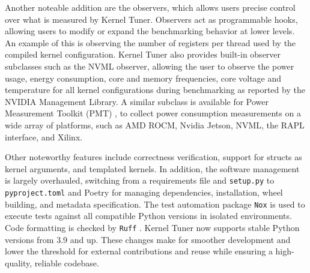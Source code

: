 Another noteable addition are the observers, which allows users precise control over what is measured by Kernel Tuner. Observers act as programmable hooks, allowing users to modify or expand the benchmarking behavior at lower levels. An example of this is observing the number of registers per thread used by the compiled kernel configuration. 
Kernel Tuner also provides built-in observer subclasses such as the NVML observer, allowing the user to observe the power usage, energy consumption, core and memory frequencies, core voltage and temperature for all kernel configurations during benchmarking as reported by the NVIDIA Management Library. A similar subclass is available for Power Measurement Toolkit (PMT) \cite{PMT2022}, to collect power consumption
measurements on a wide array of platforms, such as AMD ROCM, Nvidia Jetson, NVML, the RAPL interface, and Xilinx. 

Other noteworthy features include correctness verification, support for structs as kernel arguments, and templated kernels. 
In addition, the software management is largely overhauled, switching from a requirements file and \verb|setup.py| to \verb|pyproject.toml| and Poetry \cite{PoetryPythonPackaging2023} for managing dependencies, installation, wheel building, and metadata specification. The test automation package \verb|Nox| \cite{NoxTestAutomation} is used to execute tests against all compatible Python versions in isolated environments. Code formatting is checked by \verb|Ruff| \cite{RuffLinter}. 
Kernel Tuner now supports stable Python versions from 3.9 and up. 
These changes make for smoother development and lower the threshold for external contributions and reuse while ensuring a high-quality, reliable codebase. 

